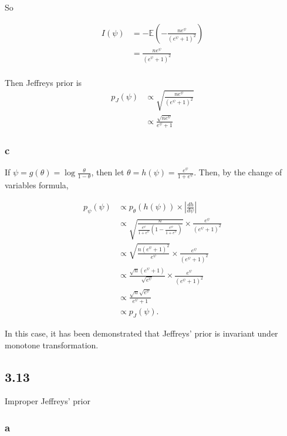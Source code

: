 \documentclass[]{article}
\begin{document}
So

\begin{align}
I(\psi) &= -\mathbb{E}\left( - \frac{n e^\psi}{\left( e^\psi + 1 \right)^2}\right) \\
&= \frac{n e^\psi}{\left( e^\psi + 1 \right)^2} \\
\end{align}

Then Jeffreys prior is \begin{align}
p_J(\psi) &\propto \sqrt{ \frac{n e^\psi}{\left( e^\psi + 1 \right)^2} } \\
&\propto \frac{\sqrt{n e^\psi}}{e^\psi + 1}
\end{align}

\hypertarget{c-4}{%
\subsubsection{c}\label{c-4}}

If \(\psi = g(\theta) = \log \frac{\theta}{1 - \theta}\), then let
\(\theta = h(\psi) = \frac{e^\psi}{1 + e^\psi}\). Then, by the change of
variables formula,

\begin{align}
p_{\psi}(\psi) &\propto p_{\theta}(h(\psi)) \times \left| \frac{dh}{d\psi} \right| \\
&\propto \sqrt{\frac{n}{\frac{e^\psi}{1 + e^\psi} \left(1 - \frac{e^\psi}{1 + e^\psi}\right)}} \times \frac{e^\psi}{(e^\psi + 1)^2} \\
&\propto \sqrt{\frac{n(e^\psi + 1)^2}{e^\psi} } \times \frac{e^\psi}{(e^\psi + 1)^2} \\
&\propto \frac{\sqrt{n}(e^\psi + 1)}{\sqrt{e^\psi}} \times \frac{e^\psi}{(e^\psi + 1)^2} \\
&\propto \frac{\sqrt{n}\sqrt{e^\psi}}{e^\psi + 1} \\
&\propto p_J(\psi).
\end{align}

In this case, it has been demonstrated that Jeffreys' prior is invariant
under monotone transformation.

\hypertarget{section-8}{%
\subsection{3.13}\label{section-8}}

Improper Jeffreys' prior

\hypertarget{a-7}{%
\subsubsection{a}\label{a-7}}
\end{document}
